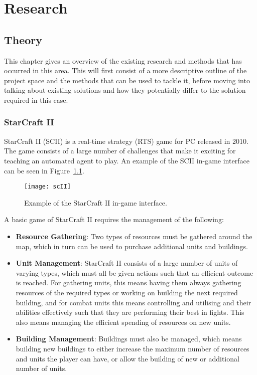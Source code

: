 \chapter{Research}%
\label{research}

\section{Theory}

This chapter gives an overview of the existing research and methods that
has occurred in this area. This will first consist of a more descriptive
outline of the project space and the methods that can be used to tackle it,
before moving into talking about existing solutions and how they potentially
differ to the solution required in this case.

\subsection{StarCraft II}

StarCraft II (SCII) is a real-time strategy (RTS) game for PC released in 2010.
The game consists of a large number of challenges that make it exciting for
teaching an automated agent to play. An example of the SCII in-game
interface can be seen in Figure~\ref{fig:scII}.

\begin{figure}
    \centering
    \texttt{[image: scII]}
    \caption{Example of the StarCraft II in-game interface.}%
    \label{fig:scII}
\end{figure}

A basic game of StarCraft II requires the management of the following:

\begin{itemize}
    \item \textbf{Resource Gathering}: Two types of resources must be gathered
        around the map, which in turn can be used to purchase additional units
        and buildings.
    \item \textbf{Unit Management}: StarCraft II consists of a large number of
        units of varying types, which must all be given actions such that an
        efficient outcome is reached. For gathering units, this means having
        them always gathering resources of the required types or working on
        building the next required building, and for combat units
        this means controlling and utilising and their abilities effectively
        such that they are performing their best in fights. This also means
        managing the efficient spending of resources on new units.
    \item \textbf{Building Management}: Buildings must also be managed, which
        means building new buildings to either increase the maximum number of
        resources and units the player can have, or allow the building of new or
        additional number of units.
\end{itemize}

